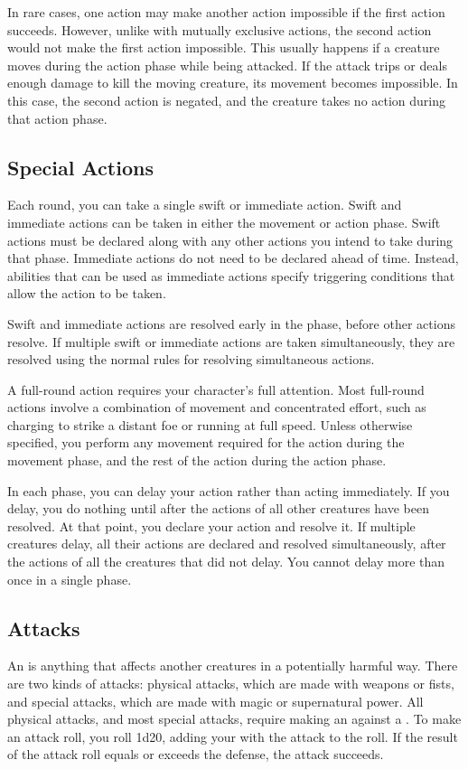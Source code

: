  In rare cases, one action may make another action impossible if the first action succeeds.
However, unlike with mutually exclusive actions, the second action would not make the first action impossible.
This usually happens if a creature moves during the action phase while being attacked.
If the attack trips or deals enough damage to kill the moving creature, its movement becomes impossible.
In this case, the second action is negated, and the creature takes no action during that action phase.

\subsection{Special Actions}

\label{Swift and Immediate Actions} Each round, you can take a single swift or immediate action.
Swift and immediate actions can be taken in either the movement or action phase.
Swift actions must be declared along with any other actions you intend to take during that phase.
Immediate actions do not need to be declared ahead of time.
Instead, abilities that can be used as immediate actions specify triggering conditions that allow the action to be taken.

Swift and immediate actions are resolved early in the phase, before other actions resolve.
If multiple swift or immediate actions are taken simultaneously, they are resolved using the normal rules for resolving simultaneous actions.

 A full-round action requires your character's full attention.
Most full-round actions involve a combination of movement and concentrated effort, such as charging to strike a distant foe or running at full speed.
Unless otherwise specified, you perform any movement required for the action during the movement phase, and the rest of the action during the action phase.

\label{Delaying}
In each phase, you can delay your action rather than acting immediately.
If you delay, you do nothing until after the actions of all other creatures have been resolved.
At that point, you declare your action and resolve it.
If multiple creatures delay, all their actions are declared and resolved simultaneously, after the actions of all the creatures that did not delay.
You cannot delay more than once in a single phase.

\subsection{Attacks}\label{Attacks}
An  is anything that affects another creatures in a potentially harmful way.
There are two kinds of attacks: physical attacks, which are made with weapons or fists, and special attacks, which are made with magic or supernatural power.
All physical attacks, and most special attacks, require making an  against a .
To make an attack roll, you roll 1d20, adding your  with the attack to the roll.
If the result of the attack roll equals or exceeds the defense, the attack succeeds.

